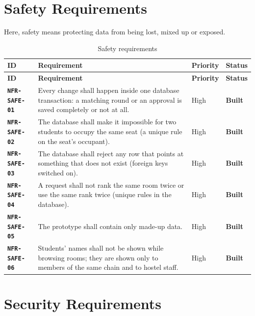 \documentclass[11pt,a4paper,parskip=half,toc=listof]{scrreprt}
\newcommand{\Built}{\textcolor{builtgreen}{\textbf{Built}}}
\newcommand{\Req}[1]{\textbf{\texttt{#1}}}
\newcommand{\ReqHeader}{%
  \toprule
  \textbf{ID} & \textbf{Requirement} & \textbf{Priority} & \textbf{Status}\\
  \midrule}
\begin{document}
\section{Safety Requirements}

Here, safety means protecting data from being lost, mixed up or exposed.

\begin{xltabular}{\linewidth}{@{}L{2.25cm}YL{1.55cm}L{1.6cm}@{}}
  \caption{Safety requirements}\label{tab:nfr-safe}\\
  \ReqHeader
  \endfirsthead
  \ReqHeader
  \endhead
  \bottomrule
  \endlastfoot
  \Req{NFR-SAFE-01} & Every change shall happen inside one database
    transaction: a matching round or an approval is saved completely or
    not at all. & High & \Built\\
  \Req{NFR-SAFE-02} & The database shall make it impossible for two
    students to occupy the same seat (a unique rule on the seat's
    occupant). & High & \Built\\
  \Req{NFR-SAFE-03} & The database shall reject any row that points at
    something that does not exist (foreign keys switched on). & High &
    \Built\\
  \Req{NFR-SAFE-04} & A request shall not rank the same room twice or use
    the same rank twice (unique rules in the database). & High & \Built\\
  \Req{NFR-SAFE-05} & The prototype shall contain only made-up data. & High
    & \Built\\
  \Req{NFR-SAFE-06} & Students' names shall not be shown while browsing
    rooms; they are shown only to members of the same chain and to hostel
    staff. & High & \Built\\
\end{xltabular}

\section{Security Requirements}
\end{document}

